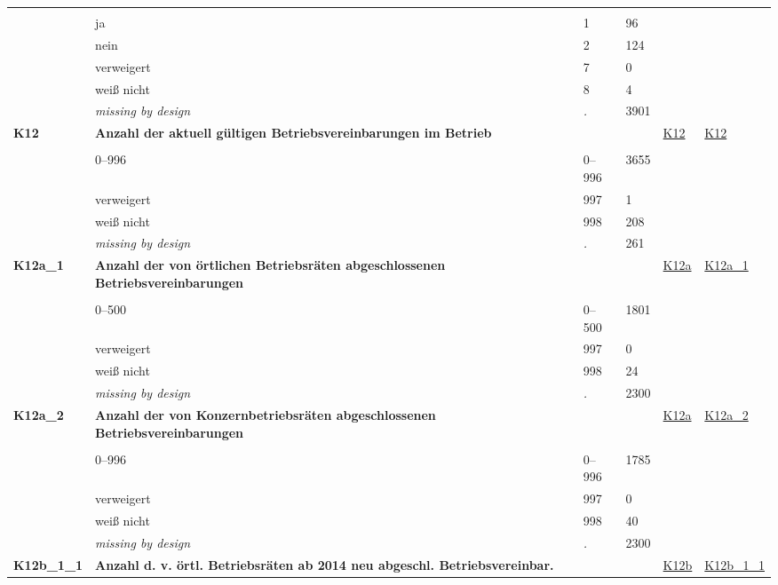 \begin{longtable}{| L{2.45cm} | L{6cm} | C{1.5cm} | R{1cm} | C{2.25cm} | C{2.25cm} |}
   &  &  &  &  &  \\ 
   & ja & 1 & 96 &  &  \\ 
   & nein & 2 & 124 &  &  \\ 
   & verweigert & 7 & 0 &  &  \\ 
   & weiß nicht & 8 & 4 &  &  \\ 
   & \textit{missing by design} & \textit{.} & 3901 &  &  \\ 
   \midrule
\textbf{K12}\label{var:K12} & \textbf{Anzahl der aktuell gültigen Betriebsvereinbarungen im Betrieb} &  &  & \hyperref[K12]{K12} & \hyperref[var:suf:K12]{K12} \\ 
   &  &  &  &  &  \\ 
   & 0--996 & 0--996 & 3655 &  &  \\ 
   & verweigert & 997 & 1 &  &  \\ 
   & weiß nicht & 998 & 208 &  &  \\ 
   & \textit{missing by design} & \textit{.} & 261 &  &  \\ 
   \midrule
\textbf{K12a\_1}\label{var:K12a:1} & \textbf{Anzahl der von örtlichen Betriebsräten abgeschlossenen Betriebsvereinbarungen} &  &  & \hyperref[K12a]{K12a} & \hyperref[var:suf:K12a:1]{K12a\_1} \\ 
   &  &  &  &  &  \\ 
   & 0--500 & 0--500 & 1801 &  &  \\ 
   & verweigert & 997 & 0 &  &  \\ 
   & weiß nicht & 998 & 24 &  &  \\ 
   & \textit{missing by design} & \textit{.} & 2300 &  &  \\ 
   \midrule
\textbf{K12a\_2}\label{var:K12a:2} & \textbf{Anzahl der von Konzernbetriebsräten abgeschlossenen Betriebsvereinbarungen} &  &  & \hyperref[K12a]{K12a} & \hyperref[var:suf:K12a:2]{K12a\_2} \\ 
   &  &  &  &  &  \\ 
   & 0--996 & 0--996 & 1785 &  &  \\ 
   & verweigert & 997 & 0 &  &  \\ 
   & weiß nicht & 998 & 40 &  &  \\ 
   & \textit{missing by design} & \textit{.} & 2300 &  &  \\ 
   \midrule
\textbf{K12b\_1\_1}\label{var:K12b:1:1} & \textbf{Anzahl d. v. örtl. Betriebsräten ab 2014 neu abgeschl. Betriebsvereinbar.} &  &  & \hyperref[K12b]{K12b} & \hyperref[var:suf:K12b:1:1]{K12b\_1\_1} \\ 

\end{longtable}
